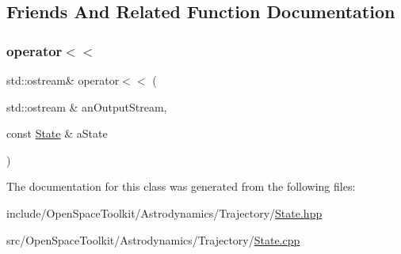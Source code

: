 \subsection{Friends And Related Function Documentation}
\mbox{\label{classostk_1_1astro_1_1trajectory_1_1_state_abba03f039f2534d691a1dc28426e8b89}} 
\subsubsection{\texorpdfstring{operator$<$$<$}{operator<<}}
{\footnotesize\ttfamily std\+::ostream\& operator$<$$<$ (\begin{DoxyParamCaption}\item[{std\+::ostream \&}]{an\+Output\+Stream,  }\item[{const \hyperlink{classostk_1_1astro_1_1trajectory_1_1_state}{State} \&}]{a\+State }\end{DoxyParamCaption})\hspace{0.3cm}{\ttfamily [friend]}}



The documentation for this class was generated from the following files\+:\begin{DoxyCompactItemize}
\item 
include/\+Open\+Space\+Toolkit/\+Astrodynamics/\+Trajectory/\hyperlink{_trajectory_2_state_8hpp}{State.\+hpp}\item 
src/\+Open\+Space\+Toolkit/\+Astrodynamics/\+Trajectory/\hyperlink{_trajectory_2_state_8cpp}{State.\+cpp}\end{DoxyCompactItemize}
